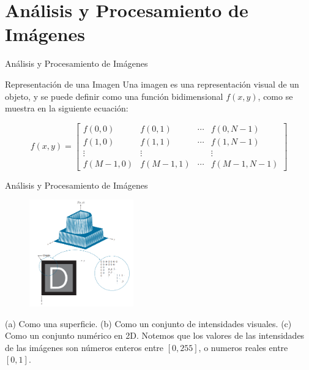 \documentclass{beamer}
\begin{document}
\section{Análisis y Procesamiento de Imágenes}
\begin{frame}{Análisis y Procesamiento de Imágenes}
    \begin{block}{Representación de una Imagen}
        Una imagen es una representaci\'on visual de un objeto, y se puede definir como una funci\'on bidimensional $f(x,y)$, como se muestra en la siguiente ecuaci\'on:

        $$
        f(x, y)=\left[\begin{array}{cccc}
        f(0,0) & f(0,1) & \cdots & f(0, N-1) \\
        f(1,0) & f(1,1) & \cdots & f(1, N-1) \\
        \vdots & \vdots & & \vdots \\
        f(M-1,0) & f(M-1,1) & \cdots & f(M-1, N-1)
        \end{array}\right]
        $$
    \end{block}
\end{frame}
\begin{frame}{Análisis y Procesamiento de Imágenes}
    \begin{figure}[H]
        \centering
        \includegraphics[width=0.4\textwidth]{dip_4_fig2_18.png}
    \end{figure}   
    (a) Como una superficie.
    (b) Como un conjunto de intensidades visuales.
    (c) Como un conjunto numérico en 2D.
    Notemos que los valores de las intensidades de las imágenes son números enteros entre $[0, 255]$, o numeros reales entre $[0, 1]$.

\end{frame}
\end{document}
